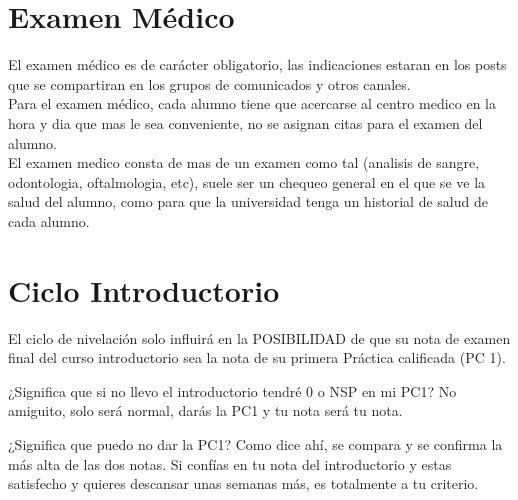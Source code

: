 \section{Examen Médico}

El examen médico es de carácter obligatorio, las indicaciones estaran en los posts que se compartiran en los grupos de comunicados y otros canales.\\
Para el examen médico, cada alumno tiene que acercarse al centro medico en la hora y dia que mas le sea conveniente, no se asignan citas para el examen del alumno.\\
El examen medico consta de mas de un examen como tal (analisis de sangre, odontologia, oftalmologia, etc), suele ser un chequeo general en el que se ve la salud del alumno, como para que la universidad tenga un historial de salud de cada alumno.\\



\section{Ciclo Introductorio}

El ciclo de nivelación solo influirá en la POSIBILIDAD de que su nota de examen final del curso introductorio sea la nota de su primera Práctica calificada (PC 1).

¿Significa que si no llevo el introductorio tendré 0 o NSP en mi PC1?
No amiguito, solo será normal, darás la PC1 y tu nota será tu nota.

¿Significa que puedo no dar la PC1? 
Como dice ahí, se compara y se confirma la más alta de las dos notas. Si confías en tu nota del introductorio y estas satisfecho y quieres descansar unas semanas más, es totalmente a tu criterio.
